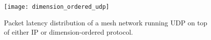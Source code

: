 \captionsetup[subfloat]{captionskip=-0.003in}
\begin{figure}
    \centering
        \texttt{[image: dimension\_ordered\_udp]}
        \label{fig:dimension_ordered}
    \caption{Packet latency distribution of a mesh network running UDP on top of either IP or dimension-ordered protocol.}
\end{figure}

